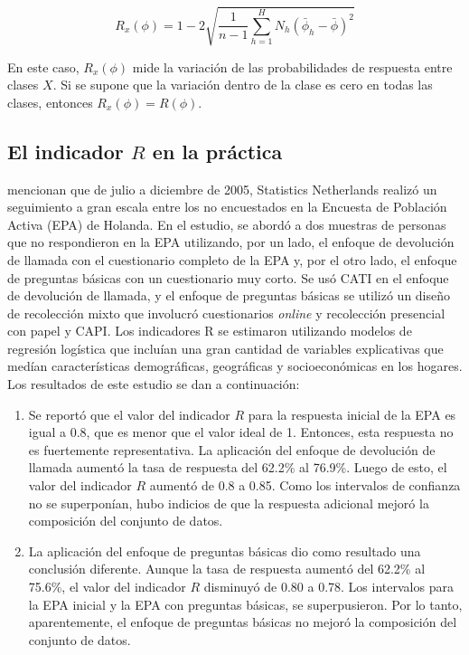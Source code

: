 \documentclass[
  12pt,
  spanish,
]{book}
\providecommand{\tightlist}{%
  \setlength{\itemsep}{0pt}\setlength{\parskip}{0pt}}
\begin{document}
\[
R_{x}\left(\phi\right)  =  1-2\sqrt{\frac{1}{n-1}\sum_{h=1}^{H}N_{h}\left(\bar{\phi}_{h}-\bar{\phi}\right)^{2}}
\]

En este caso, \(R_{x}\left(\phi\right)\) mide la variación de las probabilidades de respuesta entre clases \(X\). Si se supone que la variación dentro de la clase es cero en todas las clases, entonces \(R_{x}\left(\phi\right) = R\left(\phi\right)\).

\hypertarget{el-indicador-r-en-la-pruxe1ctica}{%
\subsection{\texorpdfstring{El indicador \(R\) en la práctica}{El indicador R en la práctica}}\label{el-indicador-r-en-la-pruxe1ctica}}

\citet{Bethlehem_Cobben_Schouten_2009} mencionan que de julio a diciembre de 2005, Statistics Netherlands realizó un seguimiento a gran escala entre los no encuestados en la Encuesta de Población Activa (EPA) de Holanda. En el estudio, se abordó a dos muestras de personas que no respondieron en la EPA utilizando, por un lado, el enfoque de devolución de llamada con el cuestionario completo de la EPA y, por el otro lado, el enfoque de preguntas básicas con un cuestionario muy corto. Se usó CATI en el enfoque de devolución de llamada, y el enfoque de preguntas básicas se utilizó un diseño de recolección mixto que involucró cuestionarios \emph{online} y recolección presencial con papel y CAPI. Los indicadores R se estimaron utilizando modelos de regresión logística que incluían una gran cantidad de variables explicativas que medían características demográficas, geográficas y socioeconómicas en los hogares. Los resultados de este estudio se dan a continuación:

\begin{enumerate}
\def\labelenumi{\arabic{enumi}.}
\tightlist
\item
  Se reportó que el valor del indicador \(R\) para la respuesta inicial de la EPA es igual a 0.8, que es menor que el valor ideal de 1. Entonces, esta respuesta no es fuertemente representativa. La aplicación del enfoque de devolución de llamada aumentó la
  tasa de respuesta del 62.2\% al 76.9\%. Luego de esto, el valor del indicador \(R\) aumentó de 0.8 a 0.85. Como los intervalos de confianza no se superponían, hubo indicios de que la respuesta adicional mejoró la composición del conjunto de datos.
\item
  La aplicación del enfoque de preguntas básicas dio como resultado
  una conclusión diferente. Aunque la tasa de respuesta aumentó del 62.2\% al 75.6\%, el valor del indicador \(R\) disminuyó de 0.80 a 0.78. Los intervalos para la EPA inicial y la EPA con preguntas básicas, se superpusieron. Por lo tanto, aparentemente, el enfoque de preguntas básicas no mejoró la composición del conjunto de datos.
\end{enumerate}
\end{document}
